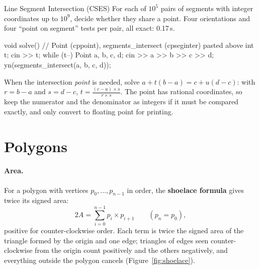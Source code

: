 
\begin{problem}{Line Segment Intersection (CSES)}
For each of $10^5$ pairs of segments with integer coordinates up to $10^9$, decide whether they share a point.
\solution Four orientations and four ``point on segment'' tests per pair, all exact: 0.17\,s.
\end{problem}

\begin{code}
void solve() {  // Point (cppoint), segments_intersect (cpseginter) pasted above
    int t;
    cin >> t;
    while (t--) {
        Point a, b, c, d;
        cin >> a >> b >> c >> d;
        yn(segments_intersect(a, b, c, d));
    }
}
\end{code}

When the intersection \emph{point} is needed, solve $a + t(b - a) = c + u(d - c)$: with $r = b - a$ and $s = d - c$, $t = \frac{(c - a)
\times s}{r \times s}$. The point has rational coordinates, so keep the numerator and the denominator as integers if it must be compared
exactly, and only convert to floating point for printing.

\section[Polygons]{Polygons \hfill \gold}\label{sec:polygons}

\paragraph{Area.} For a polygon with vertices $p_0, \dots, p_{n-1}$ in order, the \textbf{shoelace formula} gives twice its signed area:
\[
  2A = \sum_{i=0}^{n-1} p_i \times p_{i+1} \qquad (p_n = p_0),
\]
positive for counter-clockwise order. Each term is twice the signed area of the triangle formed by the origin and one edge; triangles
of edges seen counter-clockwise from the origin count positively and the others negatively, and everything outside the polygon cancels
(Figure~\ref{fig:shoelace}).


